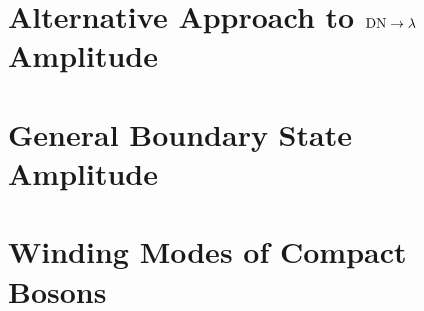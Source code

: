 \documentclass[reprint, prb]{revtex4-1}
\begin{document}
\section{Alternative Approach to ${\rm DN} \rightarrow \lambda$ Amplitude}
\label{app:gnd_dn_lambda}


\section{General Boundary State Amplitude}
\label{app:lambda_12}


\section{Winding Modes of Compact Bosons}
\label{app:compact_diff_boson}




\end{document}
